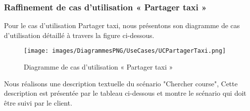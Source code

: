 {\subsubsection{Raffinement de cas d'utilisation « Partager taxi »}
Pour le cas d'utilisation Partager taxi, nous présentons son diagramme de cas d'utilisation détaillé à travers la figure ci-dessous.
\begin{figure}[H]
\centering
\texttt{[image: images/DiagrammesPNG/UseCases/UCPartagerTaxi.png]}
\caption{Diagramme de cas d'utilisation « Partager taxi »}
\end{figure}
Nous réalisons une description textuelle du scénario "Chercher course", Cette description est présentée par le tableau ci-dessous et montre le scénario qui doit être suivi par le client.\\

}
